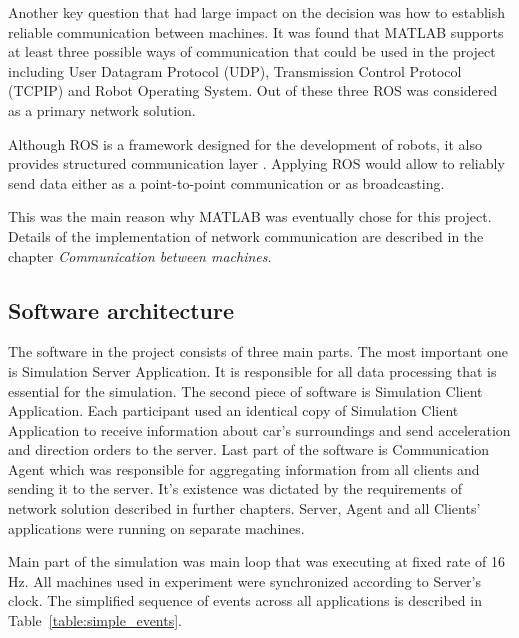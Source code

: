 \documentclass[11pt,english]{article}
\begin{document}
\par

Another key question that had large impact on the decision was how to establish reliable communication between machines. It was found that MATLAB supports at least three possible ways of communication that could be used in the project including User Datagram Protocol (UDP), Transmission Control Protocol (TCPIP) and Robot Operating System. Out of these three ROS was considered as a primary network solution.

\par
Although ROS is a framework designed for the development of robots, it also provides structured communication layer \citep{quigley2009ros}. Applying ROS would allow to reliably send data either as a point-to-point communication or as broadcasting.

\par
 This was the main reason why MATLAB was eventually chose for this project.
Details of the implementation of network communication are described in the chapter \textit{Communication between machines}.




\subsection{Software architecture}

The software in the project consists of three  main parts. The most important one is Simulation Server Application. It is responsible for all data processing that is essential for the simulation. The second piece of software is Simulation Client Application. Each participant used an identical copy of Simulation Client Application to receive information about car's surroundings and send acceleration and direction orders to the server. Last part of the software is Communication Agent which was responsible for aggregating information from all clients and sending it to the server. It's existence was dictated by the requirements of network solution described in further chapters. Server, Agent and all Clients' applications were running on separate machines.
\par
Main part of the simulation was main loop that was executing at fixed rate of 16 Hz. All machines used in experiment were synchronized according to Server's clock. The simplified sequence of events across all applications is described in Table~\ref{table:simple_events}.

\par
\end{document}
